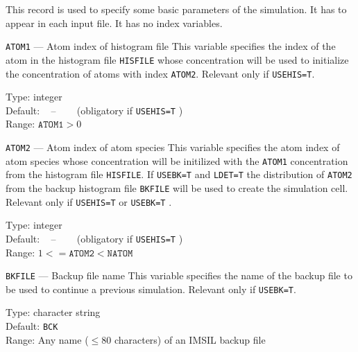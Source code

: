 This record is used to specify some basic parameters of the
simulation.  It has to appear in each input file.  It has no index
variables.

\begin{keydescription}{\texttt{ATOM1} --- Atom index of histogram file}
%
  This variable specifies the index of the atom in the histogram file 
  \texttt{HISFILE} whose concentration will be used to initialize the
  concentration of atoms with index \texttt{ATOM2}. Relevant only if 
  \texttt{USEHIS=T}.
%
  \begin{keytab}
    Type:    \> integer \\
    Default: \> ~ -- ~~~ (obligatory if \texttt{USEHIS=T} ) \\
    Range:   \>  $\texttt{ATOM1} > 0$
  \end{keytab}
\end{keydescription}

\begin{keydescription}{\texttt{ATOM2} --- Atom index of atom species}
%
  This variable specifies the atom index of atom species whose concentration 
  will be initilized with the \texttt{ATOM1} concentration from the histogram 
  file \texttt{HISFILE}. 
  \ifprivate
  If \texttt{USEBK=T} and \texttt{LDET=T} the distribution of
  \texttt{ATOM2} from the backup histogram file \texttt{BKFILE} will be
  used to create the simulation cell. 
  \fi
  Relevant only if \texttt{USEHIS=T} 
  \ifprivate
  or \texttt{USEBK=T}
  \fi
  .
%
  \begin{keytab}
    Type:    \> integer \\
    Default: \> ~ -- ~~~ (obligatory if \texttt{USEHIS=T} ) \\
    Range:   \>  $1 <= \texttt{ATOM2} < \texttt{NATOM}$
  \end{keytab}
\end{keydescription}

\begin{keydescription}{\texttt{BKFILE} --- Backup file name}
%
  This variable specifies the name of the backup file to be used to continue 
  a previous simulation. Relevant only if \texttt{USEBK=T}.
%
  \begin{keytab}
    Type:    \> character string \\
    Default: \> \texttt{BCK} \\
    Range:   \> Any name ($\le 80$ characters) of an IMSIL backup file 
  \end{keytab}
\end{keydescription}

